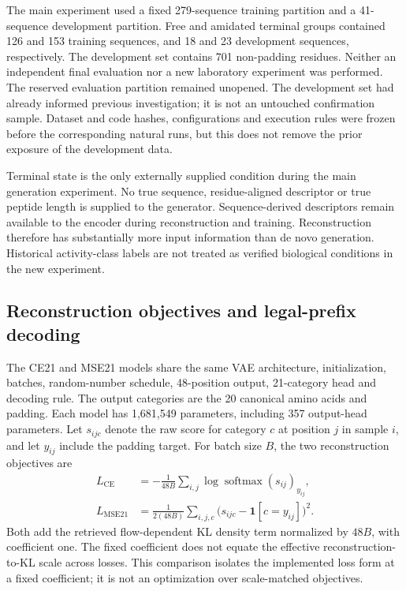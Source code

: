 \documentclass[12pt,a4paper]{article}
\begin{document}
The main experiment used a fixed 279-sequence training partition and a 41-sequence development partition. Free and amidated terminal groups contained 126 and 153 training sequences, and 18 and 23 development sequences, respectively. The development set contains 701 non-padding residues. Neither an independent final evaluation nor a new laboratory experiment was performed. The reserved evaluation partition remained unopened. The development set had already informed previous investigation; it is not an untouched confirmation sample. Dataset and code hashes, configurations and execution rules were frozen before the corresponding natural runs, but this does not remove the prior exposure of the development data.

Terminal state is the only externally supplied condition during the main generation experiment. No true sequence, residue-aligned descriptor or true peptide length is supplied to the generator. Sequence-derived descriptors remain available to the encoder during reconstruction and training. Reconstruction therefore has substantially more input information than de novo generation. Historical activity-class labels are not treated as verified biological conditions in the new experiment.

\subsection{Reconstruction objectives and legal-prefix decoding}
The CE21 and MSE21 models share the same VAE architecture, initialization, batches, random-number schedule, 48-position output, 21-category head and decoding rule. The output categories are the 20 canonical amino acids and padding. Each model has 1,681,549 parameters, including 357 output-head parameters. Let $s_{ijc}$ denote the raw score for category $c$ at position $j$ in sample $i$, and let $y_{ij}$ include the padding target. For batch size $B$, the two reconstruction objectives are
\begin{align}
 L_{\mathrm{CE}}&=-\frac{1}{48B}\sum_{i,j}\log\operatorname{softmax}(s_{ij})_{y_{ij}},\\
 L_{\mathrm{MSE21}}&=\frac{1}{2(48B)}\sum_{i,j,c}\bigl(s_{ijc}-\mathbf{1}[c=y_{ij}]\bigr)^2.
\end{align}
Both add the retrieved flow-dependent KL density term normalized by $48B$, with coefficient one. The fixed coefficient does not equate the effective reconstruction-to-KL scale across losses. This comparison isolates the implemented loss form at a fixed coefficient; it is not an optimization over scale-matched objectives.
\end{document}
